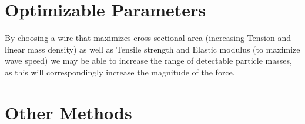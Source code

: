 \documentclass{report}
\begin{document}
\section*{Optimizable Parameters}
By choosing a wire that maximizes cross-sectional area (increasing Tension and linear mass density) as well as Tensile strength and Elastic modulus (to maximize wave speed) we may be able to increase the range of detectable 
particle masses, as this will correspondingly increase the magnitude of the force.
\section*{Other Methods}
\printbibliography[]
\end{document}
